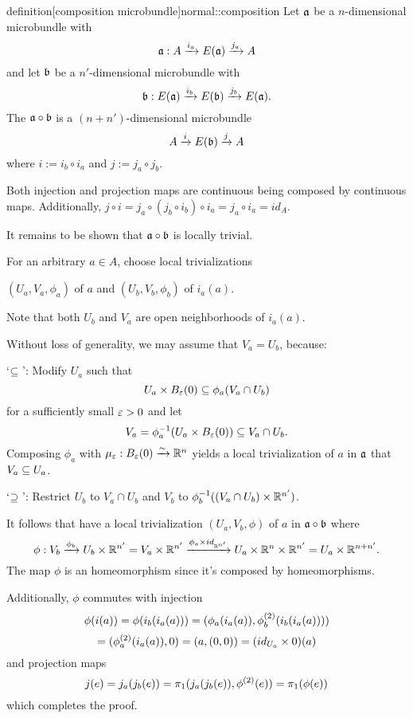 \begin{mystatement}{definition}[composition microbundle]{normal::composition}
    Let $\ba$ be a $n$-dimensional microbundle with
    \[ \bundledef{\ba}{A}{E(\ba)}{i_a}{j_a} \]
    and let $\bb$ be a $n'$-dimensional microbundle with
    \[ \bundledef{\bb}{E(\ba)}{E(\bb)}{i_b}{j_b}. \]
    The  $\ba \circ \bb$ is a $(n + n')$-dimensional microbundle
    \[ \bundle{A}{E(\bb)}{i}{j} \]
    where $i := i_b \circ i_a$ and $j := j_a \circ j_b$.
\end{mystatement}

\begin{myproof}
    Both injection and projection maps are continuous being composed by continuous maps.
    Additionally, $j \circ i = j_a \circ (j_b \circ i_b) \circ i_a = j_a \circ i_a = id_A$.

    It remains to be shown that $\ba \circ \bb$ is locally trivial.

    For an arbitrary $a \in A$, choose local trivializations
    \begin{center}
        $(U_a, V_a, \phi_a)$ of $a$ and $(U_b, V_b, \phi_b)$ of $i_a(a)$.
    \end{center}
    Note that both $U_b$ and $V_a$ are open neighborhoods of $i_a(a)$.
    
    Without loss of generality, we may assume that $V_a = U_b$, because:
    
    `$\sub$':
    Modify $U_a$ such that
    \[ U_a \cross \ball[\eps] \sub \phi_a(V_a \cap U_b) \]
    for a sufficiently small $\eps > 0$ and let
    \[ V_a = \inv{\phi_a}(U_a \cross \ball[\eps]) \sub V_a \cap U_b. \]
    Composing $\phi_a$ with $\mu_\eps: \ball[\eps] \isomto \R^n$
    yields a local trivialization of $a$ in $\ba$ that $V_a \sub U_a$.

    `$\bus$': Restrict $U_b$ to $V_a \cap U_b$ and $V_b$ to $\inv{\phi_b}((V_a \cap U_b) \cross \R^{n'})$.

    It follows that have a local trivialization
    $(U_a, V_b, \phi)$ of $a$ in $\ba \circ \bb$ where
    \[ 
        \phi: V_b \xto{\phi_b} U_b \cross \R^{n'}
        = V_a \cross \R^{n'}
        \xto{\phi_a \cross id_{\R^{n'}}} U_a \cross \R^{n} \cross \R^{n'}
        = U_a \cross \R^{n + n'}.
    \]
    The map $\phi$ is an homeomorphism since it's composed by homeomorphisms.

    Additionally, $\phi$ commutes with injection
    \[ \phi(i(a)) = \phi(i_b(i_a(a))) = (\phi_a(i_a(a)), \snd{\phi_b}(i_b(i_a(a)))) \]
    \[ = (\snd{\phi_a}(i_a(a)), 0) = (a, (0, 0)) = (id_{U_a} \cross 0)(a) \]
    and projection maps
    \[ j(e) = j_a(j_b(e)) = \pi_1(j_a(j_b(e)), \snd{\phi}(e)) = \pi_1(\phi(e)) \]
    which completes the proof.
\end{myproof}